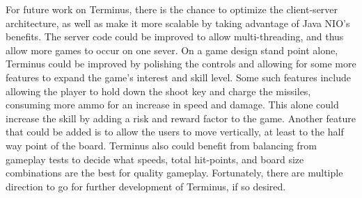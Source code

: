 \documentclass[12pt]{article}
\begin{document}
    For future work on Terminus, there is the chance to optimize the client-server architecture, as well as make it more scalable by taking advantage of Java NIO's benefits. The server code could be improved to allow multi-threading, and thus allow more games to occur on one sever. On a game design stand point alone, Terminus could be improved by polishing the controls and allowing for some more features to expand the game's interest and skill level. Some such features include allowing the player to hold down the shoot key and charge the missiles, consuming more ammo for an increase in speed and damage. This alone could increase the skill by adding a risk and reward factor to the game. Another feature that could be added is to allow the users to move vertically, at least to the half way point of the board. Terminus also could benefit from balancing from gameplay tests to decide what speeds, total hit-points, and board size combinations are the best for quality gameplay. Fortunately, there are multiple direction to go for further development of Terminus, if so desired.

    \pagebreak
    \printbibliography
\end{document}

